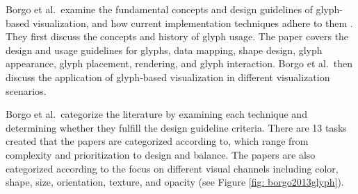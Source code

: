 
Borgo et al.\ examine the fundamental concepts and design guidelines of glyph-based visualization, and how current implementation techniques adhere to them  \cite{borgo2013glyph}.
They first discuss the concepts and history of glyph usage. The paper covers the design and usage guidelines for glyphs, data mapping, shape design, glyph appearance, glyph placement, rendering, and glyph interaction. Borgo et al.\ then discuss the application of glyph-based visualization in different visualization scenarios.

Borgo et al.\ categorize the literature by examining each technique and determining whether they fulfill the design guideline criteria. There are 13 tasks created that the papers are categorized according to, which range from complexity and prioritization to design and balance. The papers are also categorized according to the focus on different visual channels including color, shape, size, orientation, texture, and opacity (see Figure \ref{fig: borgo2013glyph}).

